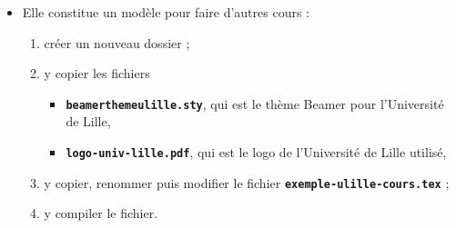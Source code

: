   \begin{itemize}
  \item Elle constitue un modèle pour faire d'autres cours :
      
    \begin{enumerate}
    \item créer un nouveau dossier ;
    \item y copier les fichiers 
      
      \begin{itemize}
      \item \texttt{\textbf{beamerthemeulille.sty}}, qui est le thème Beamer pour l'Université de Lille,
      \item \texttt{\textbf{logo-univ-lille.pdf}}, qui est le logo de l'Université de Lille utilisé,
      \end{itemize}
      
    \item y copier, renommer puis modifier le fichier \texttt{\textbf{exemple-ulille-cours.tex}} ;
    \item y compiler le fichier.
    \end{enumerate}
  \end{itemize}
